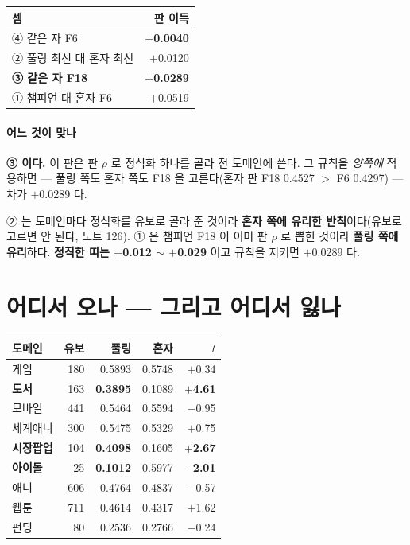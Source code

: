 \documentclass[10pt]{article}
\begin{document}
\begin{center}\small
\begin{tabular}{lr}
\hline
셈 & 판 이득 \\
\hline
④ 같은 자 F6 & \textbf{$+$0.0040} \\
② 풀링 최선 대 혼자 최선 & $+$0.0120 \\
\textbf{③ 같은 자 F18} & \textbf{$+$0.0289} \\
① 챔피언 대 혼자-F6 & $+$0.0519 \\
\hline
\end{tabular}
\end{center}

\paragraph{어느 것이 맞나} \textbf{③ 이다.} 이 판은 판 $\rho$ 로 정식화
하나를 골라 전 도메인에 쓴다. 그 규칙을 \emph{양쪽에} 적용하면 --- 풀링
쪽도 혼자 쪽도 F18 을 고른다(혼자 판 F18 0.4527 $>$ F6 0.4297) --- 차가
$+$0.0289 다.

② 는 도메인마다 정식화를 유보로 골라 준 것이라 \textbf{혼자 쪽에 유리한
반칙}이다(유보로 고르면 안 된다, 노트 126). ① 은 챔피언 F18 이 이미 판
$\rho$ 로 뽑힌 것이라 \textbf{풀링 쪽에 유리}하다. \textbf{정직한 띠는
$+$0.012 $\sim$ $+$0.029} 이고 규칙을 지키면 $+$0.0289 다.

\section{어디서 오나 --- 그리고 어디서 잃나}

\begin{center}\footnotesize
\begin{tabular}{lrrrr}
\hline
도메인 & 유보 & 풀링 & 혼자 & $t$ \\
\hline
게임 & 180 & 0.5893 & 0.5748 & $+$0.34 \\
\textbf{도서} & 163 & \textbf{0.3895} & 0.1089 & \textbf{$+$4.61} \\
모바일 & 441 & 0.5464 & 0.5594 & $-$0.95 \\
세계애니 & 300 & 0.5475 & 0.5329 & $+$0.75 \\
\textbf{시장팝업} & 104 & \textbf{0.4098} & 0.1605 & \textbf{$+$2.67} \\
\textbf{아이돌} & 25 & \textbf{0.1012} & 0.5977 & \textbf{$-$2.01} \\
애니 & 606 & 0.4764 & 0.4837 & $-$0.57 \\
웹툰 & 711 & 0.4614 & 0.4317 & $+$1.62 \\
펀딩 & 80 & 0.2536 & 0.2766 & $-$0.24 \\
\hline
\end{tabular}
\end{center}
\end{document}
